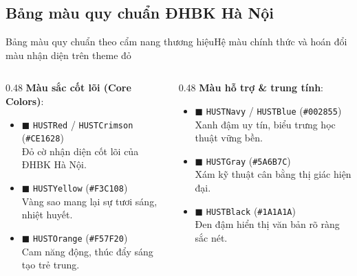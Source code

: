 \documentclass[aspectratio=43,10pt]{beamer}
\begin{document}
\subsection{Bảng màu quy chuẩn ĐHBK Hà Nội}
\begin{frame}{Bảng màu quy chuẩn theo cẩm nang thương hiệu}{Hệ màu chính thức và hoán đổi màu nhận diện trên theme đỏ}
  \small
  \begin{columns}[T]
    \begin{column}{0.48\textwidth}
      \textbf{Màu sắc cốt lõi (Core Colors)}:
      \begin{itemize}\setlength{\itemsep}{3pt}
        \item \textcolor{HUSTRed}{$\blacksquare$ \texttt{HUSTRed} / \texttt{HUSTCrimson}} (\texttt{\#CE1628})\\
          \scriptsize Đỏ cờ nhận diện cốt lõi của ĐHBK Hà Nội.
        \item \textcolor{HUSTYellow}{$\blacksquare$ \texttt{HUSTYellow}} (\texttt{\#F3C108})\\
          \scriptsize Vàng sao mang lại sự tươi sáng, nhiệt huyết.
        \item \textcolor{HUSTOrange}{$\blacksquare$ \texttt{HUSTOrange}} (\texttt{\#F57F20})\\
          \scriptsize Cam năng động, thúc đẩy sáng tạo trẻ trung.
      \end{itemize}
    \end{column}

    \begin{column}{0.48\textwidth}
      \textbf{Màu hỗ trợ \& trung tính}:
      \begin{itemize}\setlength{\itemsep}{3pt}
        \item \textcolor{HUSTNavy}{$\blacksquare$ \texttt{HUSTNavy} / \texttt{HUSTBlue}} (\texttt{\#002855})\\
          \scriptsize Xanh đậm uy tín, biểu trưng học thuật vững bền.
        \item \textcolor{HUSTGray}{$\blacksquare$ \texttt{HUSTGray}} (\texttt{\#5A6B7C})\\
          \scriptsize Xám kỹ thuật cân bằng thị giác hiện đại.
        \item \textcolor{HUSTBlack}{$\blacksquare$ \texttt{HUSTBlack}} (\texttt{\#1A1A1A})\\
          \scriptsize Đen đậm hiển thị văn bản rõ ràng sắc nét.
      \end{itemize}
    \end{column}
  \end{columns}
\end{frame}
\end{document}
